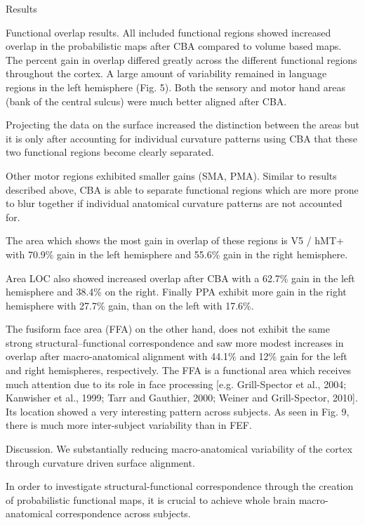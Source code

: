 Results

Functional overlap results.
%
All included functional regions showed increased overlap in the probabilistic
maps after CBA compared to volume based maps.
%
The percent gain in overlap differed greatly across the different functional
regions throughout the cortex.
%
A large amount of variability remained in language regions in the left
hemisphere (Fig. 5).
%
Both the sensory and motor hand areas (bank of the central sulcus) were much
better aligned after CBA.

%
Projecting the data on the surface increased the distinction between the areas
but it is only after accounting for individual curvature patterns using CBA that
these two functional regions become clearly separated.

%
Other motor regions exhibited smaller gains (SMA, PMA).
%
Similar to results described above, CBA is able to separate functional regions
which are more prone to blur together if individual anatomical curvature
patterns are not accounted for.

%
The area which shows the most gain in overlap of these regions is V5 / hMT+ with
70.9\% gain in the left hemisphere and 55.6\% gain in the right hemisphere.

%
Area LOC also showed increased overlap after CBA with a 62.7\% gain in the left
hemisphere and 38.4\% on the right.
%
Finally PPA exhibit more gain in the right hemisphere with 27.7\% gain, than on
the left with 17.6\%.

%
The fusiform face area (FFA) on the other hand, does not exhibit the same strong
structural–functional correspondence and saw more modest increases in overlap
after macro-anatomical alignment with 44.1\% and 12\% gain for the left and
right hemispheres, respectively.
%
The FFA is a functional area which receives much attention due to its role in
face processing [e.g. Grill-Spector et al., 2004; Kanwisher et al., 1999; Tarr
and Gauthier, 2000; Weiner and Grill-Spector, 2010].
%
Its location showed a very interesting pattern across subjects.
%
As seen in Fig.  9, there is much more inter-subject variability than in FEF.

Discussion.
%
We substantially reducing macro-anatomical variability of the cortex through
curvature driven surface alignment.
%

%
In order to investigate structural-functional correspondence through the
creation of probabilistic functional maps, it is crucial to achieve whole brain
macro-anatomical correspondence across subjects.

